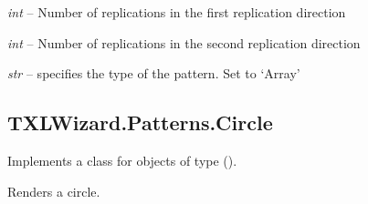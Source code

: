 \documentclass[letterpaper,10pt,english]{sphinxmanual}
\begin{document}
\begin{fulllineitems}
\begin{fulllineitems}
\label{Chapters/PythonModuleReference/Patterns/TXLWizard.Patterns.Array:TXLWizard.Patterns.Array.Array.Repetitions1}
\emph{int} -- Number of replications in the first replication direction

\end{fulllineitems}


\begin{fulllineitems}
\label{Chapters/PythonModuleReference/Patterns/TXLWizard.Patterns.Array:TXLWizard.Patterns.Array.Array.Repetitions2}
\emph{int} -- Number of replications in the second replication direction

\end{fulllineitems}


\begin{fulllineitems}
\label{Chapters/PythonModuleReference/Patterns/TXLWizard.Patterns.Array:TXLWizard.Patterns.Array.Array.Type}
\emph{str} -- specifies the type of the pattern. Set to `Array'

\end{fulllineitems}


\end{fulllineitems}



\subsection{TXLWizard.Patterns.Circle}
\label{Chapters/PythonModuleReference/Patterns/TXLWizard.Patterns.Circle:module-TXLWizard.Patterns.Circle}\label{Chapters/PythonModuleReference/Patterns/TXLWizard.Patterns.Circle::doc}\label{Chapters/PythonModuleReference/Patterns/TXLWizard.Patterns.Circle:txlwizard-patterns-circle}
Implements a class for  objects of type  ().

Renders a circle.
\end{document}
